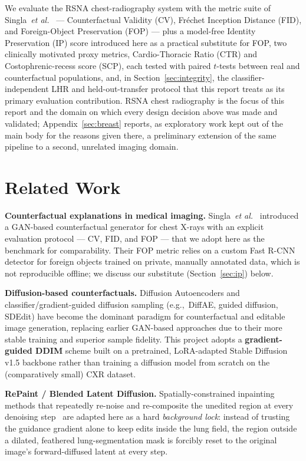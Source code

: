 \documentclass[11pt]{article}
\newcommand{\eg}{e.g.,\ }
\begin{document}
We evaluate the RSNA chest-radiography system with the metric suite of
Singla~\emph{et al.}~\cite{singla2022} — Counterfactual Validity (CV),
Fr\'echet Inception Distance (FID), and Foreign-Object Preservation (FOP)
— plus a model-free Identity Preservation (IP) score introduced here as a
practical substitute for FOP, two clinically motivated proxy metrics,
Cardio-Thoracic Ratio (CTR) and Costophrenic-recess score (SCP), each
tested with paired $t$-tests between real and counterfactual populations,
and, in Section~\ref{sec:integrity}, the classifier-independent LHR and
held-out-transfer protocol that this report treats as its primary
evaluation contribution. RSNA chest radiography is the focus of this
report and the domain on which every design decision above was made and
validated; Appendix~\ref{sec:breast} reports, as exploratory work kept out
of the main body for the reasons given there, a preliminary extension of
the same pipeline to a second, unrelated imaging domain.

\section{Related Work}

\textbf{Counterfactual explanations in medical imaging.} Singla~\emph{et
al.}~\cite{singla2022} introduced a GAN-based counterfactual generator for
chest X-rays with an explicit evaluation protocol — CV, FID, and FOP — that
we adopt here as the benchmark for comparability. Their FOP metric relies
on a custom Fast R-CNN detector for foreign objects trained on private,
manually annotated data, which is not reproducible offline; we discuss our
substitute (Section~\ref{sec:ip}) below.

\textbf{Diffusion-based counterfactuals.} Diffusion Autoencoders and
classifier/gradient-guided diffusion sampling (\eg DiffAE, guided
diffusion, SDEdit) have become the dominant paradigm for counterfactual
and editable image generation, replacing earlier GAN-based approaches due
to their more stable training and superior sample fidelity. This project
adopts a \textbf{gradient-guided DDIM} scheme built on a pretrained,
LoRA-adapted Stable Diffusion v1.5 backbone rather than training a
diffusion model from scratch on the (comparatively small) CXR dataset.

\textbf{RePaint / Blended Latent Diffusion.} Spatially-constrained
inpainting methods that repeatedly re-noise and re-composite the
unedited region at every denoising step~\cite{repaint,blended} are adapted
here as a hard \emph{background lock}: instead of trusting the guidance
gradient alone to keep edits inside the lung field, the region outside a
dilated, feathered lung-segmentation mask is forcibly reset to the
original image's forward-diffused latent at every step.
\end{document}
